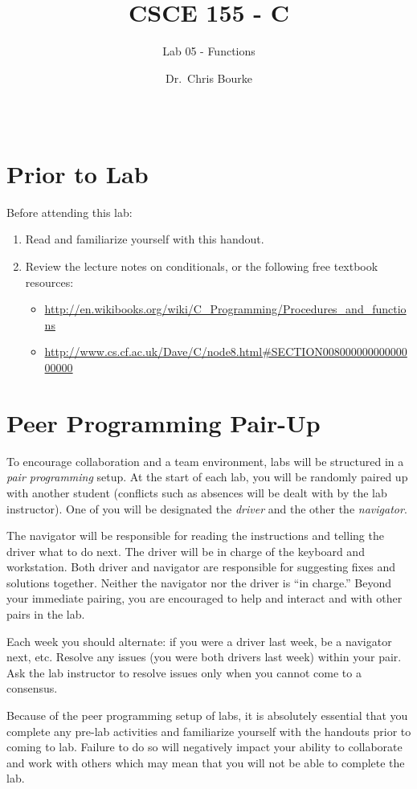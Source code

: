 \documentclass[12pt]{scrartcl}
\title{CSCE 155 - C}
\subtitle{Lab 05 - Functions}
\author{Dr.\ Chris Bourke}
\date{~}
\begin{document}
\maketitle

\section*{Prior to Lab}

Before attending this lab:
\begin{enumerate}
  \item Read and familiarize yourself with this handout.
  \item Review the lecture notes on conditionals, or the following free textbook resources:
	\begin{itemize}
  	  \item \url{http://en.wikibooks.org/wiki/C_Programming/Procedures_and_functions}
	  \item \url{http://www.cs.cf.ac.uk/Dave/C/node8.html#SECTION00800000000000000000}
	\end{itemize}
\end{enumerate}

\section*{Peer Programming Pair-Up}

To encourage collaboration and a team environment, labs will be
structured in a \emph{pair programming} setup.  At the start of
each lab, you will be randomly paired up with another student 
(conflicts such as absences will be dealt with by the lab instructor).
One of you will be designated the \emph{driver} and the other
the \emph{navigator}.  

The navigator will be responsible for reading the instructions and
telling the driver what to do next.  The driver will be in charge of the
keyboard and workstation.  Both driver and navigator are responsible
for suggesting fixes and solutions together.  Neither the navigator
nor the driver is ``in charge.''  Beyond your immediate pairing, you
are encouraged to help and interact and with other pairs in the lab.

Each week you should alternate: if you were a driver last week, 
be a navigator next, etc.  Resolve any issues (you were both drivers
last week) within your pair.  Ask the lab instructor to resolve issues
only when you cannot come to a consensus.  

Because of the peer programming setup of labs, it is absolutely 
essential that you complete any pre-lab activities and familiarize
yourself with the handouts prior to coming to lab.  Failure to do
so will negatively impact your ability to collaborate and work with 
others which may mean that you will not be able to complete the
lab.  
\end{document}
